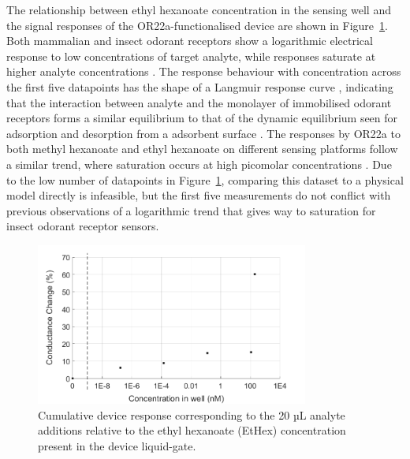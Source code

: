 \documentclass[
  a4paper,
]{scrbook}
\begin{document}
The relationship between ethyl hexanoate concentration in the sensing
well and the signal responses of the OR22a-functionalised device are
shown in Figure~\ref{fig-EtHex-responses}. Both mammalian and insect
odorant receptors show a logarithmic electrical response to low
concentrations of target analyte, while responses saturate at higher
analyte concentrations
\autocite{Persaud1982,Jin2012,Kwon2015,Yoo2022,Khadka2019,Murugathas2020,Cheema2021}.
The response behaviour with concentration across the first five
datapoints has the shape of a Langmuir response curve
\autocite{Jin2012,Kwon2015,Yoo2022}, indicating that the interaction
between analyte and the monolayer of immobilised odorant receptors forms
a similar equilibrium to that of the dynamic equilibrium seen for
adsorption and desorption from a adsorbent surface
\autocite{Ayawei2017}. The responses by OR22a to both methyl hexanoate
and ethyl hexanoate on different sensing platforms follow a similar
trend, where saturation occurs at high picomolar concentrations
\autocite{Murugathas2020,Cheema2021}. Due to the low number of
datapoints in Figure~\ref{fig-EtHex-responses}, comparing this dataset
to a physical model directly is infeasible, but the first five
measurements do not conflict with previous observations of a logarithmic
trend that gives way to saturation for insect odorant receptor sensors.

\begin{figure}

{\centering \includegraphics[width=0.8\textwidth,height=\textheight]{figures/ch7/concentrations.png}

}

\caption{\label{fig-EtHex-responses}Cumulative device response
corresponding to the 20 µL analyte additions relative to the ethyl
hexanoate (EtHex) concentration present in the device liquid-gate.}

\end{figure}
\end{document}
